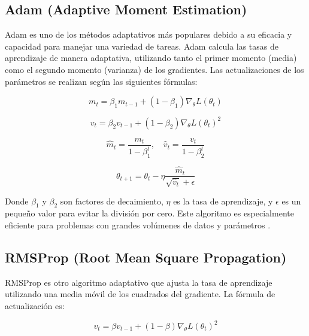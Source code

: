 \documentclass[12pt]{article}
\begin{document}
	\subsection*{Adam (Adaptive Moment Estimation)}
	
	Adam es uno de los métodos adaptativos más populares debido a su eficacia y capacidad para manejar una variedad de tareas. Adam calcula las tasas de aprendizaje de manera adaptativa, utilizando tanto el primer momento (media) como el segundo momento (varianza) de los gradientes. Las actualizaciones de los parámetros se realizan según las siguientes fórmulas:
	
	\begin{equation}
		m_t = \beta_1 m_{t-1} + (1 - \beta_1) \nabla_{\theta} L(\theta_t)
	\end{equation}
	
	\begin{equation}
		v_t = \beta_2 v_{t-1} + (1 - \beta_2) \nabla_{\theta} L(\theta_t)^2
	\end{equation}
	
	\begin{equation}
		\hat{m}_t = \frac{m_t}{1 - \beta_1^t}, \quad \hat{v}_t = \frac{v_t}{1 - \beta_2^t}
	\end{equation}
	
	\begin{equation}
		\theta_{t+1} = \theta_t - \eta \frac{\hat{m}_t}{\sqrt{\hat{v}_t} + \epsilon}
	\end{equation}
	
	Donde \( \beta_1 \) y \( \beta_2 \) son factores de decaimiento, \( \eta \) es la tasa de aprendizaje, y \( \epsilon \) es un pequeño valor para evitar la división por cero. Este algoritmo es especialmente eficiente para problemas con grandes volúmenes de datos y parámetros \cite{Kingma2015}.
	
	\subsection*{RMSProp (Root Mean Square Propagation)}
	
	RMSProp es otro algoritmo adaptativo que ajusta la tasa de aprendizaje utilizando una media móvil de los cuadrados del gradiente. La fórmula de actualización es:
	
	\begin{equation}
		v_t = \beta v_{t-1} + (1 - \beta) \nabla_{\theta} L(\theta_t)^2
	\end{equation}
	
\end{document}
